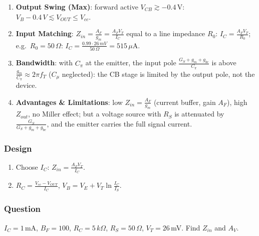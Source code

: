 \begin{enumerate}
    \paragraph{At Output:} the CE output test (Section~\ref{sec:amp_ce}) with \(R_E\) replaced
    by \(R_S\) (\(V_{in} = 0\), base at AC ground):
    \begin{align*}
      Z_{out} &= R_C \parallel r_o\left(1 + (g_m + g_o)(R_S \parallel r_{be})\right) \approx R_C \parallel r_o\left(1 + g_m (R_S \parallel r_{be})\right)
    \end{align*}
  \item \textbf{Output Swing (Max)}: forward active \(V_{CB} \gtrsim -0.4\,\)V:
    \(V_B - 0.4\,V \lesssim V_{OUT} \leq V_{cc}\).
  \item \textbf{Input Matching}: \(Z_{in} = \frac{A_F}{g_m} = \frac{A_F V_T}{I_C}\) equal to a line impedance \(R_0\):
    \(I_C = \frac{A_F V_T}{R_0}\); e.g.\ \(R_0 = 50\,\Omega\): \(I_C = \frac{0.99 \cdot 26\,mV}{50\,\Omega} = 515\,\mu\)A.
  \item \textbf{Bandwidth}: with \(C_\pi\) at the emitter, the input pole \(\frac{G_S + g_m + g_{be}}{C_\pi}\) is above
    \(\frac{g_m}{C_\pi} \approx 2\pi f_T\) (\(C_\mu\) neglected): the CB stage is limited by the output pole, not the device.
  \item \textbf{Advantages \& Limitations}: low \(Z_{in} = \frac{A_F}{g_m}\) (current buffer,
    gain \(A_F\)), high \(Z_{out}\), no Miller effect; but a voltage source with \(R_S\) is
    attenuated by \(\frac{G_S}{G_S + g_m + g_{be}}\), and the emitter carries the full signal current.
\end{enumerate}

\subsubsection{Design}
\begin{enumerate}
  \item Choose \(I_C\): \(Z_{in} = \frac{A_F V_T}{I_C}\).
  \item \(R_C = \frac{V_{cc} - V_{OUT}}{I_C}\), \(V_B = V_E + V_T\ln\frac{I_C}{I_S}\).
\end{enumerate}

\subsubsection{Question}
\(I_C = 1\,\)mA, \(B_F = 100\), \(R_C = 5\,k\Omega\), \(R_S = 50\,\Omega\),
\(V_T = 26\,\)mV. Find \(Z_{in}\) and \(A_V\).
